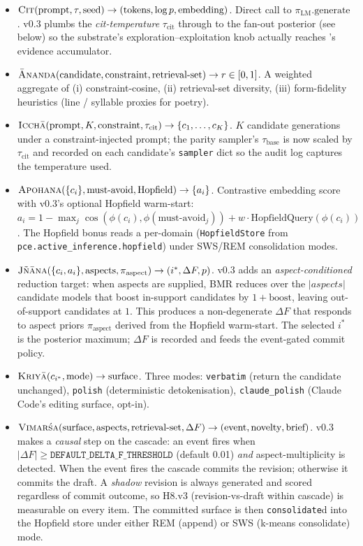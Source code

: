 \begin{itemize}[leftmargin=1.2em]
\item $\textsc{Cit}(\text{prompt}, \tau, \text{seed}) \to (\text{tokens}, \log p, \text{embedding})$. Direct call to $\pi_{\text{LM}}.\text{generate}$. v0.3 plumbs the \emph{cit-temperature} $\tau_{\text{cit}}$ through to the  fan-out posterior (see below) so the substrate's exploration--exploitation knob actually reaches 's evidence accumulator.
\item $\textsc{\=Ananda}(\text{candidate}, \text{constraint}, \text{retrieval-set}) \to r \in [0,1]$. A weighted aggregate of (i) constraint-cosine, (ii) retrieval-set diversity, (iii) form-fidelity heuristics (line / syllable proxies for poetry).
\item $\textsc{Icch\=a}(\text{prompt}, K, \text{constraint}, \tau_{\text{cit}}) \to \{c_1, \dots, c_K\}$. $K$ candidate generations under a constraint-injected prompt; the parity sampler's $\tau_{\text{base}}$ is now scaled by $\tau_{\text{cit}}$ and recorded on each candidate's \texttt{sampler} dict so the audit log captures the temperature used.
\item $\textsc{Apohana}(\{c_i\}, \text{must-avoid}, \text{Hopfield}) \to \{a_i\}$. Contrastive embedding score with v0.3's optional Hopfield warm-start: $a_i = 1 - \max_j \cos(\phi(c_i), \phi(\text{must-avoid}_j)) + w \cdot \text{HopfieldQuery}(\phi(c_i))$. The Hopfield bonus reads a per-domain  (\texttt{HopfieldStore} from \texttt{pce.active\_inference.hopfield}) under SWS/REM consolidation modes.
\item $\textsc{J\~n\=ana}(\{c_i, a_i\}, \text{aspects}, \pi_{\text{aspect}}) \to (i^*, \Delta F, p)$. v0.3 adds an \emph{aspect-conditioned} reduction target: when aspects are supplied, BMR reduces over the $|aspects|$ candidate models that boost in-support candidates by $1 + \text{boost}$, leaving out-of-support candidates at $1$. This produces a non-degenerate $\Delta F$ that responds to aspect priors $\pi_{\text{aspect}}$ derived from the Hopfield warm-start. The selected $i^*$ is the posterior maximum; $\Delta F$ is recorded and feeds the event-gated commit policy.
\item $\textsc{Kriy\=a}(c_{i^*}, \text{mode}) \to \text{surface}$. Three modes: \texttt{verbatim} (return the candidate unchanged), \texttt{polish} (deterministic detokenisation), \texttt{claude\_polish} (Claude Code's editing surface, opt-in).
\item $\textsc{Vimar\'sa}(\text{surface}, \text{aspects}, \text{retrieval-set}, \Delta F) \to (\text{event}, \text{novelty}, \text{brief})$. v0.3 makes  a \emph{causal} step on the cascade: an event fires when $|\Delta F| \geq \texttt{DEFAULT\_DELTA\_F\_THRESHOLD}$ (default 0.01) \emph{and} aspect-multiplicity is detected. When the event fires the cascade commits the revision; otherwise it commits the draft. A \emph{shadow} revision is always generated and scored regardless of commit outcome, so H8.v3 (revision-vs-draft within cascade) is measurable on every item. The committed surface is then \texttt{consolidate}d into the Hopfield store under either REM (append) or SWS (k-means consolidate) mode.
\end{itemize}

